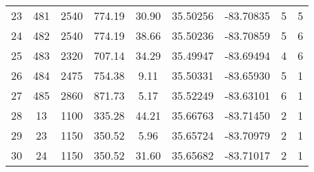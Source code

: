 \begin{table}[p]
\begin{tabular}{ccccccccc}
23 & 481                                                 & 2540                                                          & 774.19                                                       & 30.90 & 35.50256 & -83.70835 & 5                                                                                      & 5 \\ 
24 & 482                                                 & 2540                                                          & 774.19                                                       & 38.66 & 35.50236 & -83.70859 & 5                                                                                      & 6 \\ 
25 & 483                                                 & 2320                                                          & 707.14                                                       & 34.29 & 35.49947 & -83.69494 & 4                                                                                      & 6 \\ 
26 & 484                                                 & 2475                                                          & 754.38                                                       & 9.11   & 35.50331 & -83.65930 & 5                                                                                      & 1 \\ 
27 & 485                                                 & 2860                                                          & 871.73                                                       & 5.17   & 35.52249 & -83.63101 & 6                                                                                      & 1 \\ 
28 & 13                                                   & 1100                                                          & 335.28                                                       & 44.21 & 35.66763 & -83.71450 & 2                                                                                      & 1 \\ 
29 & 23                                                   & 1150                                                          & 350.52                                                       & 5.96   & 35.65724 & -83.70979 & 2                                                                                      & 1 \\ 
30 & 24                                                   & 1150                                                          & 350.52                                                       & 31.60 & 35.65682 & -83.71017 & 2                                                                                      & 1 \\ 

\end{tabular}
\end{table}
